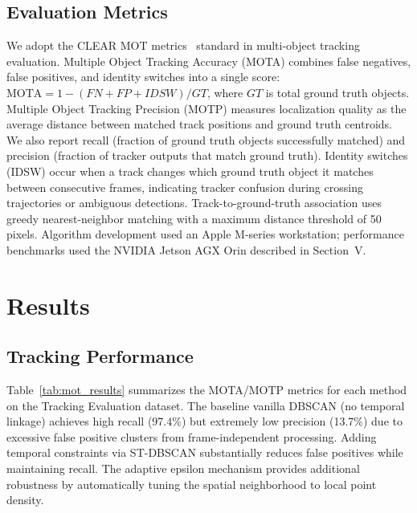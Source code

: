 \documentclass[conf]{new-aiaa}
\begin{document}
\subsection{Evaluation Metrics}

We adopt the CLEAR MOT metrics~\cite{Bernardin2008} standard in multi-object tracking evaluation. Multiple Object Tracking Accuracy (MOTA) combines false negatives, false positives, and identity switches into a single score: $\text{MOTA} = 1 - (FN + FP + IDSW)/GT$, where $GT$ is total ground truth objects. Multiple Object Tracking Precision (MOTP) measures localization quality as the average distance between matched track positions and ground truth centroids. We also report recall (fraction of ground truth objects successfully matched) and precision (fraction of tracker outputs that match ground truth). Identity switches (IDSW) occur when a track changes which ground truth object it matches between consecutive frames, indicating tracker confusion during crossing trajectories or ambiguous detections. Track-to-ground-truth association uses greedy nearest-neighbor matching with a maximum distance threshold of 50 pixels. Algorithm development used an Apple M-series workstation; performance benchmarks used the NVIDIA Jetson AGX Orin described in Section~V.

\section{Results}

\subsection{Tracking Performance}

Table~\ref{tab:mot_results} summarizes the MOTA/MOTP metrics for each method on the Tracking Evaluation dataset. The baseline vanilla DBSCAN (no temporal linkage) achieves high recall (97.4\%) but extremely low precision (13.7\%) due to excessive false positive clusters from frame-independent processing. Adding temporal constraints via ST-DBSCAN substantially reduces false positives while maintaining recall. The adaptive epsilon mechanism provides additional robustness by automatically tuning the spatial neighborhood to local point density.
\end{document}

